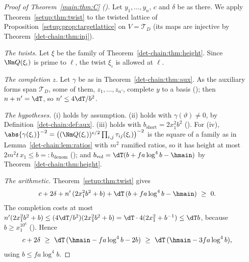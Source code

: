 \begin{proof}[Proof of Theorem~\ref{main:thm:C} ()]
Let $y_1,\dots,y_n$, $c$ and $\delta$ be as there. We apply Theorem~\ref{setup:thm:twist} to the twisted lattice of
Proposition~\ref{setup:prop:targetlattice} on $V=\mathcal{T}_D$ (its maps are injective by
Theorem~\ref{det-chain:thm:inj}).

\emph{The twists.} Let $\xi$ be the family of Theorem~\ref{det-chain:thm:height}. Since
$\Nm Q(\xi_\iota)$ is prime to $\ell$, the twist $\xi_\iota$ is allowed at $\ell$.

\emph{The completion $z$.} Let $\gamma$ be as in Theorem~\ref{det-chain:thm:aux}. As the auxiliary
forms span $\mathcal{T}_D$, some of them, $z_1,\dots,z_{n'}$, complete $y$ to a basis
(); then $n+n'=\dT$, so $n'\le4\dT/b^2$.

\emph{The hypotheses.} (i) holds by assumption. (ii) holds with $\gamma(\vartheta)\ne0$, by
Definition~\ref{det-chain:def:aux}. (iii) holds with $b_{\mathrm{short}}=2x_1^2b^2$
(). For (iv),
$\abs{\gamma(\xi_\iota)}^{-2}=\bigl((\Nm Q(\xi_\iota))^{e/2}\prod_{i,j}\tau_{ij}(\xi_\iota)
\bigr)^{-2}$ is the square of a family as in Lemma~\ref{det-chain:lem:ratios} with $m^2$ ramified
ratios, so it has height at most $2m^2t\,x_1\le b=:b_{\mathrm{denom}}$
(); and
$b_{\mathrm{vol}}=\dT(b+f a\log^4b-\hmain)$ by Theorem~\ref{det-chain:thm:height}.

\emph{The arithmetic.} Theorem~\ref{setup:thm:twist} gives
\[
  c+2\delta+n'\,(2x_1^2b^2+b)+\dT\,(b+f a\log^4b-\hmain)\ \ge\ 0 .
\]
The completion costs at most $n'(2x_1^2b^2+b)\le(4\dT/b^2)(2x_1^2b^2+b)=\dT\cdot4(2x_1^2+b^{-1})\le
\dT b$, because $b\ge x_1^{10^6}$ (). Hence
\[
  c+2\delta\ \ge\ \dT\,(\hmain-f a\log^4b-2b)\ \ge\ \dT\,(\hmain-3f a\log^4b),
\]
using $b\le f a\log^4b$.
\end{proof}
